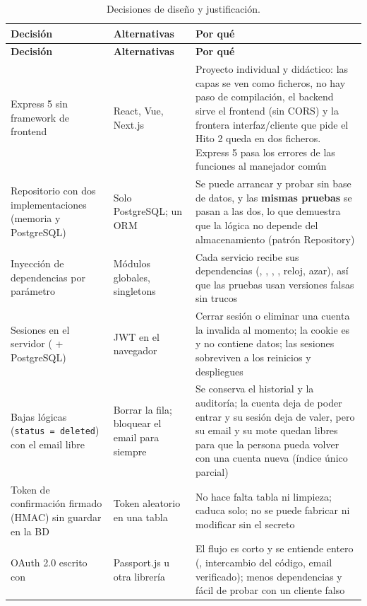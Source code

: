 \begin{longtable}{@{}L{2.8cm} L{3.2cm} L{6.5cm}@{}}
\caption{Decisiones de diseño y justificación.}\label{tab:decisiones}\\
\toprule
\textbf{Decisión} & \textbf{Alternativas} & \textbf{Por qué} \\ \midrule \endfirsthead
\toprule
\textbf{Decisión} & \textbf{Alternativas} & \textbf{Por qué} \\ \midrule \endhead
Express 5 sin framework de frontend & React, Vue, Next.js & Proyecto individual y didáctico: las capas se ven como ficheros, no hay paso de compilación, el backend sirve el frontend (sin CORS) y la frontera interfaz/cliente que pide el Hito 2 queda en dos ficheros. Express 5 pasa los errores de las funciones  al manejador común \\
Repositorio con dos implementaciones (memoria y PostgreSQL) & Solo PostgreSQL; un ORM & Se puede arrancar y probar sin base de datos, y las \textbf{mismas pruebas} se pasan a las dos, lo que demuestra que la lógica no depende del almacenamiento (patrón Repository) \\
Inyección de dependencias por parámetro & Módulos globales, singletons & Cada servicio recibe sus dependencias (, , , , reloj, azar), así que las pruebas usan versiones falsas sin trucos \\
Sesiones en el servidor ( + PostgreSQL) & JWT en el navegador & Cerrar sesión o eliminar una cuenta la invalida al momento; la cookie es  y no contiene datos; las sesiones sobreviven a los reinicios y despliegues \\
Bajas lógicas (\texttt{status = deleted}) con el email libre & Borrar la fila; bloquear el email para siempre & Se conserva el historial y la auditoría; la cuenta deja de poder entrar y su sesión deja de valer, pero su email y su mote quedan libres para que la persona pueda volver con una cuenta nueva (índice único parcial) \\
Token de confirmación firmado (HMAC) sin guardar en la BD & Token aleatorio en una tabla & No hace falta tabla ni limpieza; caduca solo; no se puede fabricar ni modificar sin el secreto \\
OAuth 2.0 escrito con  & Passport.js u otra librería & El flujo es corto y se entiende entero (, intercambio del código, email verificado); menos dependencias y fácil de probar con un cliente falso \cite{rfc6749} \\

\end{longtable}
